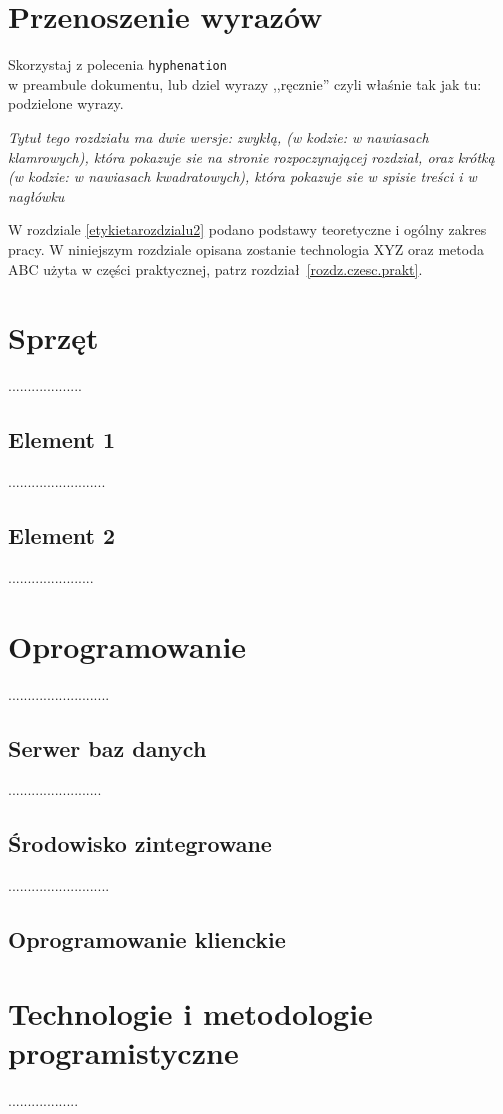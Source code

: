 \documentclass[12pt]{report}
\begin{document}
\section{Przenoszenie wyrazów}
Skorzystaj z polecenia {\tt hyphenation}\\ w preambule dokumentu, lub dziel
wyrazy ,,ręcznie'' czyli właśnie tak jak tu: po\-dzie\-lo\-ne wy\-ra\-zy. 



{\em Tytuł tego rozdziału ma dwie wersje: zwykłą, (w kodzie: w nawiasach
klamrowych), która
pokazuje sie na stronie rozpoczynającej rozdział, oraz krótką (w kodzie: w nawiasach
kwadratowych), która pokazuje sie w spisie treści i w nagłówku}

W rozdziale \ref{etykietarozdzialu2} podano podstawy teoretyczne i ogólny zakres
pracy. W niniejszym rozdziale opisana zostanie technologia XYZ oraz metoda ABC
użyta w części praktycznej, patrz rozdział~\ref{rozdz.czesc.prakt}. 

\section{Sprzęt}
...................
\subsection{Element 1}
.........................
\subsection{Element 2}
......................

\section{Oprogramowanie}
..........................
\subsection{Serwer baz danych}
........................
\subsection{Środowisko zintegrowane}
..........................
\subsection{Oprogramowanie klienckie}

\section{Technologie i metodologie programistyczne}
..................
\end{document}
